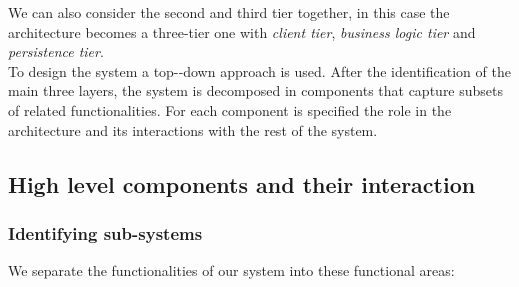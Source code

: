 \documentclass[a4paper,11pt]{report} %
\begin{document}
	We can also consider the second and third tier together, in this case the architecture becomes a three-tier one with \textit{client tier}, \textit{business logic tier} and \textit{persistence tier}.\\
	To design the system a top-­‐down approach is used. After the identification of the main three layers, the system is decomposed in components that capture subsets of related functionalities. For each component is specified the role in the architecture and its interactions with the rest of the system. 
	
	\subsection{High level components and their interaction} 
	
	\subsubsection{Identifying sub-systems} We separate the functionalities of our system into these functional areas:
\end{document}
